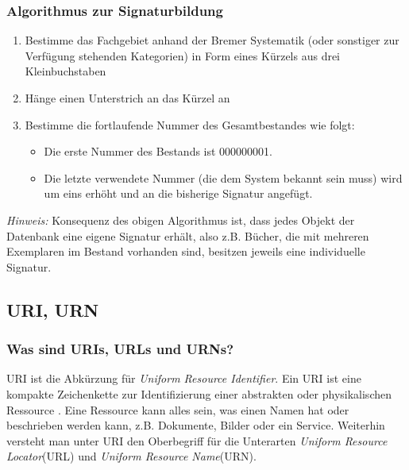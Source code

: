 \subsubsection{Algorithmus zur Signaturbildung} 
    
    \begin{enumerate}
        
        
          
        \item Bestimme das Fachgebiet  anhand der Bremer Systematik (oder sonstiger zur
          Verf\"ugung stehenden Kategorien) in Form eines
          K\"urzels aus drei Kleinbuchstaben

        \item H\"ange einen Unterstrich an das K\"urzel an
        
        
        \item Bestimme die fortlaufende Nummer des Gesamtbestandes wie folgt:
          \begin{itemize}
            
          \item Die erste Nummer des Bestands ist 000000001.
          
          \item Die letzte verwendete Nummer (die dem System bekannt sein muss) wird um
              eins erh\"oht und an die bisherige Signatur angef\"ugt.
          
          \end{itemize}

   \end{enumerate}
\textit {Hinweis:} Konsequenz des obigen Algorithmus ist, dass jedes Objekt der Datenbank 
eine eigene Signatur erh\"alt, also z.B. B\"ucher, die mit mehreren Exemplaren im Bestand
vorhanden sind, besitzen jeweils eine individuelle Signatur.

\subsection{URI, URN}

\subsubsection{Was sind URIs, URLs und URNs?}

URI  ist die Abk\"urzung f\"ur \textit{Uniform Resource Identifier}. Ein URI ist eine kompakte
Zeichenkette zur Identifizierung einer abstrakten oder physikalischen Ressource \cite{rfc2396}.
Eine Ressource  kann alles sein, was einen Namen hat oder beschrieben werden kann, z.B. Dokumente, 
Bilder oder ein Service.
Weiterhin versteht man unter URI den Oberbegriff f\"ur die Unterarten \textit{Uniform Resource Locator}(URL)
und \textit{Uniform Resource Name}(URN). 

